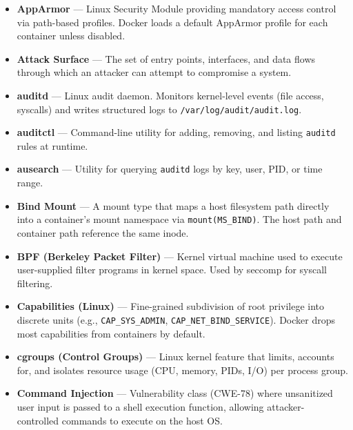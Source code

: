 \begin{itemize}

    \item \textbf{AppArmor} ---
    Linux Security Module providing mandatory access control via
    path-based profiles. Docker loads a default AppArmor profile
    for each container unless disabled.

    \item \textbf{Attack Surface} ---
    The set of entry points, interfaces, and data flows through
    which an attacker can attempt to compromise a system.

    \item \textbf{auditd} ---
    Linux audit daemon. Monitors kernel-level events (file access,
    syscalls) and writes structured logs to
    \texttt{/var/log/audit/audit.log}.

    \item \textbf{auditctl} ---
    Command-line utility for adding, removing, and listing
    \texttt{auditd} rules at runtime.

    \item \textbf{ausearch} ---
    Utility for querying \texttt{auditd} logs by key, user, PID,
    or time range.

    \item \textbf{Bind Mount} ---
    A mount type that maps a host filesystem path directly into a
    container's mount namespace via \texttt{mount(MS\_BIND)}.
    The host path and container path reference the same inode.

    \item \textbf{BPF (Berkeley Packet Filter)} ---
    Kernel virtual machine used to execute user-supplied filter
    programs in kernel space. Used by seccomp for syscall
    filtering.

    \item \textbf{Capabilities (Linux)} ---
    Fine-grained subdivision of root privilege into discrete
    units (e.g., \texttt{CAP\_SYS\_ADMIN},
    \texttt{CAP\_NET\_BIND\_SERVICE}). Docker drops most
    capabilities from containers by default.

    \item \textbf{cgroups (Control Groups)} ---
    Linux kernel feature that limits, accounts for, and isolates
    resource usage (CPU, memory, PIDs, I/O) per process group.

    \item \textbf{Command Injection} ---
    Vulnerability class (CWE-78) where unsanitized user input is
    passed to a shell execution function, allowing attacker-
    controlled commands to execute on the host OS.


\end{itemize}
